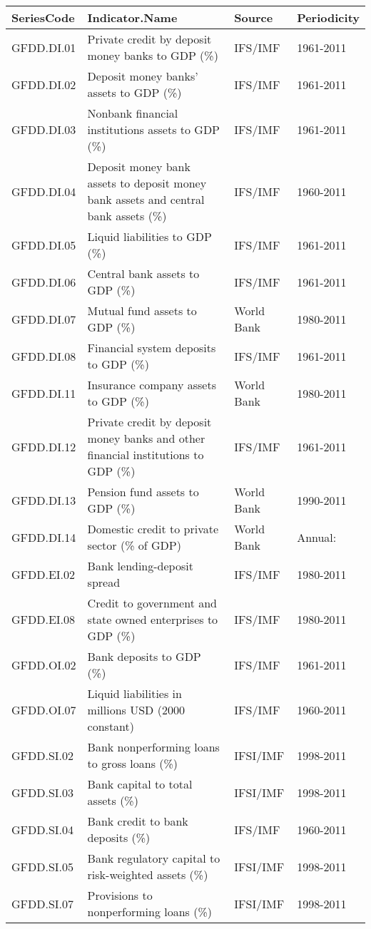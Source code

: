 {\scriptsize
\begin{tabular}{llll}
  \hline
SeriesCode & Indicator.Name & Source & Periodicity \\ 
  \hline
GFDD.DI.01 & Private credit by deposit money banks to GDP (\%) & IFS/IMF & 1961-2011 \\ 
  GFDD.DI.02 & Deposit money banks' assets to GDP (\%) & IFS/IMF & 1961-2011 \\ 
  GFDD.DI.03 & Nonbank financial institutions assets to GDP (\%) & IFS/IMF & 1961-2011 \\ 
  GFDD.DI.04 & Deposit money bank assets to deposit money bank assets and central bank assets (\%) & IFS/IMF & 1960-2011 \\ 
  GFDD.DI.05 & Liquid liabilities to GDP (\%) & IFS/IMF & 1961-2011 \\ 
  GFDD.DI.06 & Central bank assets to GDP (\%) & IFS/IMF & 1961-2011 \\ 
  GFDD.DI.07 & Mutual fund assets to GDP (\%) & World Bank & 1980-2011 \\ 
  GFDD.DI.08 & Financial system deposits to GDP (\%) & IFS/IMF & 1961-2011 \\ 
  GFDD.DI.11 & Insurance company assets to GDP (\%) & World Bank & 1980-2011 \\ 
  GFDD.DI.12 & Private credit by deposit money banks and other financial institutions to GDP (\%) & IFS/IMF & 1961-2011 \\ 
  GFDD.DI.13 & Pension fund assets to GDP (\%) & World Bank & 1990-2011 \\ 
  GFDD.DI.14 & Domestic credit to private sector (\% of GDP) & World Bank & Annual: \\ 
  GFDD.EI.02 & Bank lending-deposit spread & IFS/IMF & 1980-2011 \\ 
  GFDD.EI.08 & Credit to government and state owned enterprises to GDP (\%) & IFS/IMF & 1980-2011 \\ 
  GFDD.OI.02 & Bank deposits to GDP (\%) & IFS/IMF & 1961-2011 \\ 
  GFDD.OI.07 & Liquid liabilities in millions USD (2000 constant) & IFS/IMF & 1960-2011 \\ 
  GFDD.SI.02 & Bank nonperforming loans to gross loans (\%) & IFSI/IMF & 1998-2011 \\ 
  GFDD.SI.03 & Bank capital to total assets (\%) & IFSI/IMF & 1998-2011 \\ 
  GFDD.SI.04 & Bank credit to bank deposits (\%) & IFS/IMF & 1960-2011 \\ 
  GFDD.SI.05 & Bank regulatory capital to risk-weighted assets (\%) & IFSI/IMF & 1998-2011 \\ 
  GFDD.SI.07 & Provisions to nonperforming loans (\%) & IFSI/IMF & 1998-2011 \\ 
   \hline
\end{tabular}
}
